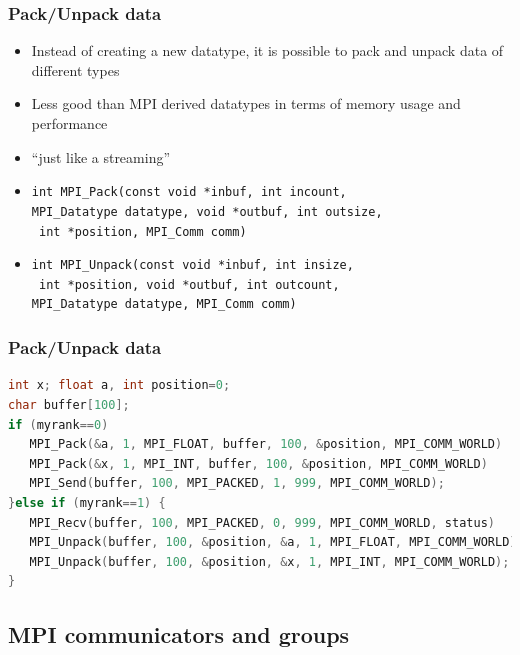 \begin{frame}[containsverbatim]
\frametitle{Pack/Unpack data}	
\begin{itemize}
	\item { Instead of creating a new datatype, it is possible to pack and unpack data of different types }
	\item { Less good than MPI derived datatypes in terms of memory usage and performance }
	\item { ``just like a streaming'' }
	\item { \verb+int MPI_Pack(const void *inbuf, int incount, +\\\verb+MPI_Datatype datatype, void *outbuf, int outsize,+\\\verb+ int *position, MPI_Comm comm)+}
	\item { \verb+int MPI_Unpack(const void *inbuf, int insize,+\\\verb+ int *position, void *outbuf, int outcount, +\\\verb+MPI_Datatype datatype, MPI_Comm comm)+}
\end{itemize}
\end{frame}


\begin{frame}[containsverbatim]
\frametitle{Pack/Unpack data}	
\begin{lstlisting}[language=C,frame=lines]
int x; float a, int position=0;
char buffer[100];
if (myrank==0)
   MPI_Pack(&a, 1, MPI_FLOAT, buffer, 100, &position, MPI_COMM_WORLD)
   MPI_Pack(&x, 1, MPI_INT, buffer, 100, &position, MPI_COMM_WORLD)
   MPI_Send(buffer, 100, MPI_PACKED, 1, 999, MPI_COMM_WORLD);
}else if (myrank==1) {
   MPI_Recv(buffer, 100, MPI_PACKED, 0, 999, MPI_COMM_WORLD, status)
   MPI_Unpack(buffer, 100, &position, &a, 1, MPI_FLOAT, MPI_COMM_WORLD);
   MPI_Unpack(buffer, 100, &position, &x, 1, MPI_INT, MPI_COMM_WORLD);
}
\end{lstlisting}
\end{frame}


\subsection{MPI communicators and groups}




